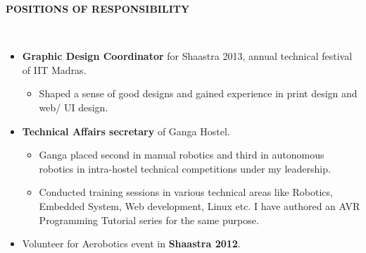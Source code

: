 \documentclass[a4paper,10pt]{article}
\newcommand{\lsep}{-0.5cm}
\newcommand{\resheading}[1]{{\small \colorbox{mygrey}{\begin{minipage}{0.975\textwidth}{\textbf{#1 \vphantom{p\^{E}}}}\end{minipage}}}}
\begin{document}
\resheading{\textbf{POSITIONS OF RESPONSIBILITY} }\\[\lsep]
    \begin{itemize}
        \item \textbf{Graphic Design Coordinator} for Shaastra 2013, annual technical festival of 
        IIT Madras.
        \vspace{-5pt}
        \begin{itemize}
            \item Shaped a sense of good designs and gained experience in print design and web/ UI design.
        \end{itemize}
        \vspace{-5pt}
        \item \textbf{Technical Affairs secretary} of Ganga Hostel.
        \vspace{-5pt}
            \begin{itemize}
            \item  Ganga placed second in manual robotics and third in autonomous robotics in intra-hostel technical competitions under my leadership.
            \item Conducted training sessions in various technical areas like Robotics, Embedded System, Web development, Linux etc. I have authored an AVR Programming  Tutorial series for the same purpose.
            \end{itemize}
        \vspace{-5pt}
        \item Volunteer for Aerobotics event in \textbf{Shaastra 2012}.
    \end{itemize}
\end{document}
